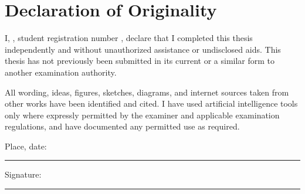 \chapter*{Declaration of Originality}

I, \theauthor, student registration number \thestudentid, declare that I completed this thesis independently and without unauthorized assistance or undisclosed aids.
This thesis has not previously been submitted in its current or a similar form to another examination authority.

All wording, ideas, figures, sketches, diagrams, and internet sources taken from other works have been identified and cited.
I have used artificial intelligence tools only where expressly permitted by the examiner and applicable examination regulations, and have documented any permitted use as required.

\vspace{3em}
\noindent Place, date: \rule{5cm}{0.4pt}\hfill Signature: \rule{5cm}{0.4pt}